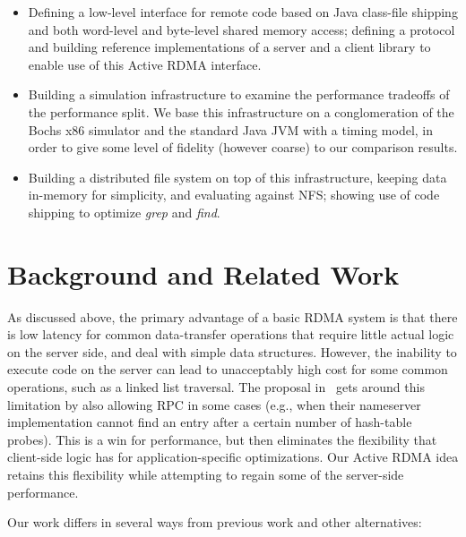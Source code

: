 \documentclass[10pt]{article}
\begin{document}
\begin{itemize} \itemsep -2pt

\item Defining a low-level interface for remote code based on Java
  class-file shipping and both word-level and byte-level shared memory
  access; defining a protocol and building reference implementations
  of a server and a client library to enable use of this Active RDMA
  interface.

\item Building a simulation infrastructure to examine the performance
  tradeoffs of the performance split. We base this infrastructure on a
  conglomeration of the Bochs x86 simulator and the standard Java JVM
  with a timing model, in order to give some level of fidelity
  (however coarse) to our comparison results.

\item Building a distributed file system on top of this
  infrastructure, keeping data in-memory for simplicity, and
  evaluating against NFS; showing use of code shipping to optimize
  \emph{grep} and \emph{find}.

\end{itemize}

\section{Background and Related Work}

As discussed above, the primary advantage of a basic RDMA system is
that there is low latency for common data-transfer operations that
require little actual logic on the server side, and deal with simple
data structures. However, the inability to execute code on the server
can lead to unacceptably high cost for some common operations, such as
a linked list traversal. The proposal in~\cite{thekkath94} gets around
this limitation by also allowing RPC in some cases (e.g., when their
nameserver implementation cannot find an entry after a certain number
of hash-table probes). This is a win for performance, but then
eliminates the flexibility that client-side logic has for
application-specific optimizations. Our Active RDMA idea retains this
flexibility while attempting to regain some of the server-side
performance.

Our work differs in several ways from previous work and other
alternatives:
\end{document}
